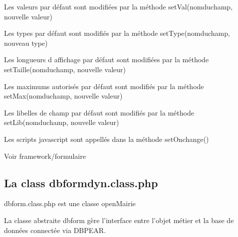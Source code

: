 \documentclass[letterpaper,10pt,french]{manual}
\begin{document}
Les valeurs par défaut sont modifiées par la méthode setVal(nomduchamp, nouvelle valeur)

Les types par défaut sont modifiés par la méthode setType(nomduchamp, nouveau type)

Les longueurs d affichage par défaut sont modifiées par la méthode setTaille(nomduchamp, nouvelle valeur)

Les maximums autorisés par défaut sont modifiés par la méthode setMax(nomduchamp, nouvelle valeur)

Les libelles de champ par défaut sont modifiés par la méthode setLib(nomduchamp, nouvelle valeur)

Les scripts javascript sont appellés dans la méthode setOnchange()

Voir framework/formulaire


\subsection{La class dbformdyn.class.php}

dbform.class.php  est une classe openMairie

La classe abstraite dbform gère l’interface entre l'objet métier et la base de données connectée via DBPEAR.
\end{document}
